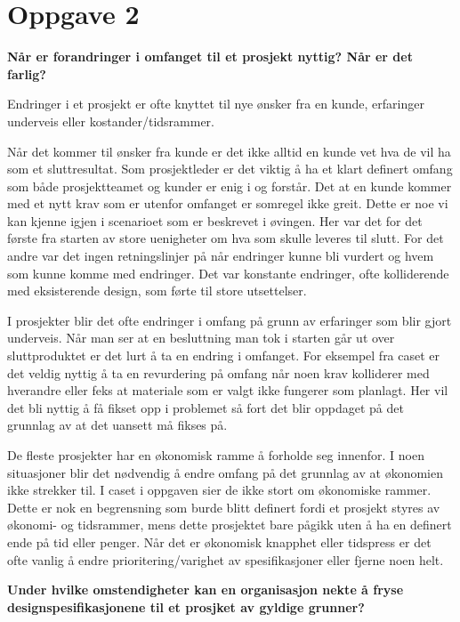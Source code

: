 \clearpage
\section*{Oppgave 2}
	
	{\bf Når er forandringer i omfanget til et prosjekt nyttig? Når er det farlig?}

		Endringer i et prosjekt er ofte knyttet til nye ønsker fra en kunde, erfaringer underveis
		eller kostander/tidsrammer. 

		Når det kommer til ønsker fra kunde er det ikke alltid en kunde vet hva de vil ha
		som et sluttresultat. Som prosjektleder er det viktig å ha et klart definert
		omfang som både prosjektteamet og kunder er enig i og forstår. Det at en kunde kommer med
		et nytt krav som er utenfor omfanget er somregel ikke greit. 
		Dette er noe vi kan kjenne igjen i scenarioet som er beskrevet i øvingen. Her var det for 
		det første fra starten av store uenigheter om hva som skulle leveres til slutt. 
		For det andre var det ingen retningslinjer på når endringer kunne bli vurdert og hvem
		som kunne komme med endringer. Det var konstante endringer, ofte kolliderende med eksisterende
		design, som førte til store utsettelser. 

		I prosjekter blir det ofte endringer i omfang på grunn av erfaringer som blir gjort underveis. 
		Når man ser at en besluttning man tok i starten går ut over sluttproduktet er det lurt å ta
		en endring i omfanget. For eksempel fra caset er det veldig nyttig å ta en revurdering på
		omfang når noen krav kolliderer med hverandre eller feks at materiale som er valgt ikke 
		fungerer som planlagt. Her vil det bli nyttig å få fikset opp i problemet så fort det blir
		oppdaget på det grunnlag av at det uansett må fikses på. 

		De fleste prosjekter har en økonomisk ramme å forholde seg innenfor. I noen situasjoner blir
		det nødvendig å endre omfang på det grunnlag av at økonomien ikke strekker til. I caset i 
		oppgaven sier de ikke stort om økonomiske rammer. Dette er nok en begrensning som burde blitt
		definert fordi et prosjekt styres av økonomi- og tidsrammer, mens dette prosjektet bare pågikk
		uten å ha en definert ende på tid eller penger. 
		Når det er økonomisk knapphet eller tidspress er det ofte vanlig å endre prioritering/varighet
		av spesifikasjoner eller fjerne noen helt. 

\clearpage
	{\bf Under hvilke omstendigheter kan en organisasjon nekte å fryse designspesifikasjonene
	til et prosjket av gyldige grunner?}

